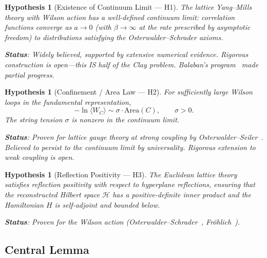 \documentclass[11pt]{article}
\newtheorem{hypothesis}[theorem]{Hypothesis}
\begin{document}
\begin{hypothesis}[Existence of Continuum Limit --- H1]
\label{hyp:H1}
The lattice Yang--Mills theory with Wilson action has a well-defined
continuum limit: correlation functions converge as $a \to 0$ (with
$\beta \to \infty$ at the rate prescribed by asymptotic freedom) to
distributions satisfying the Osterwalder--Schrader axioms.

\smallskip\noindent
\textbf{Status}: Widely believed, supported by extensive numerical
evidence.  Rigorous construction is open---this IS half of the Clay
problem.  Balaban's program~\cite{Balaban} made partial progress.
\end{hypothesis}

\begin{hypothesis}[Confinement / Area Law --- H2]
\label{hyp:H2}
For sufficiently large Wilson loops in the fundamental representation,
\begin{equation}\label{eq:confinement}
  -\ln\langle W_C \rangle \sim \sigma \cdot \mathrm{Area}(C),
  \qquad \sigma > 0.
\end{equation}
The string tension $\sigma$ is nonzero in the continuum limit.

\smallskip\noindent
\textbf{Status}: Proven for lattice gauge theory at strong coupling by
Osterwalder--Seiler~\cite{OS}.  Believed to persist to the continuum
limit by universality.  Rigorous extension to weak coupling is open.
\end{hypothesis}

\begin{hypothesis}[Reflection Positivity --- H3]
\label{hyp:H3}
The Euclidean lattice theory satisfies reflection positivity with
respect to hyperplane reflections, ensuring that the reconstructed
Hilbert space $\mathcal{H}$ has a positive-definite inner product
and the Hamiltonian $H$ is self-adjoint and bounded below.

\smallskip\noindent
\textbf{Status}: Proven for the Wilson action
(Osterwalder--Schrader~\cite{OstSchr}, Fr\"ohlich~\cite{Froh}).
\end{hypothesis}

\subsection{Central Lemma}
\end{document}
